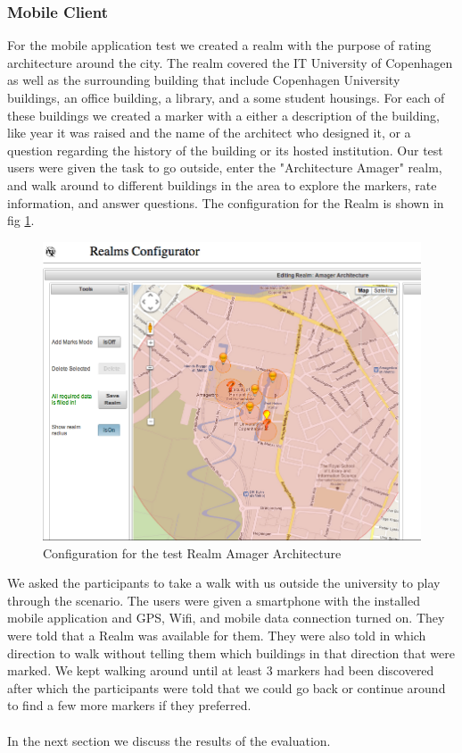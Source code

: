 \subsubsection{Mobile Client} %
\label{sub:android_application_evaluation}
For the mobile application test we created a realm with the purpose of rating architecture around the city. The realm covered the IT University of Copenhagen as well as the surrounding building that include Copenhagen University buildings, an office building, a library, and a some student housings. For each of these buildings we created a marker with a either a description of the building, like year it was raised and the name of the architect who designed it, or a question regarding the history of the building or its hosted institution. Our test users were given the task to go outside, enter the "Architecture Amager" realm, and walk around to different buildings in the area to explore the markers, rate information, and answer questions. The configuration for the Realm is shown in fig \ref{fig.amager.arc}.
\\

\begin{figure}[ht]
	\centering
	\includegraphics[scale=0.5]{fig/amager_configuration}
	\caption{Configuration for the test Realm Amager Architecture}
	\label{fig.amager.arc}
\end{figure}

\noinden We asked the participants to take a walk with us outside the university to play through the scenario. The users were given a smartphone with the installed mobile application and GPS, Wifi, and mobile data connection turned on. They were told that a Realm was available for them. They were also told in which direction to walk without telling them which buildings in that direction that were marked. We kept walking around until at least 3 markers had been discovered after which the participants were told that we could go back or continue around to find a few more markers if they preferred.
\\\\
In the next section we discuss the results of the evaluation.

